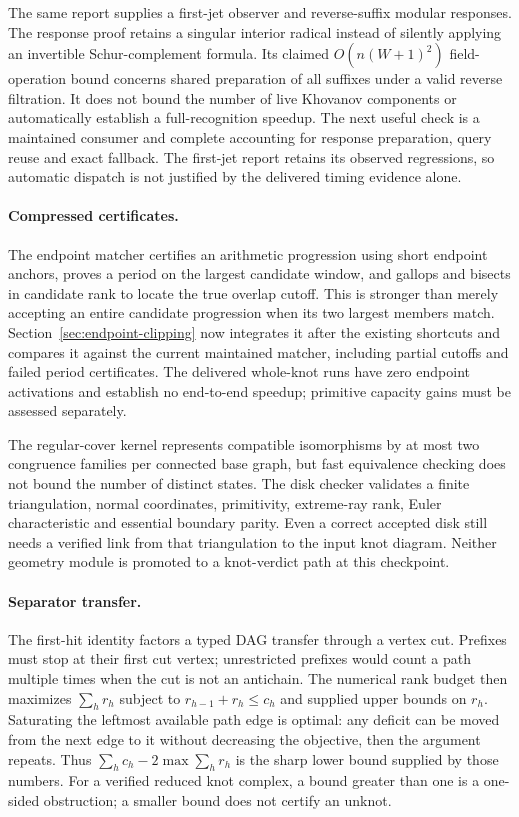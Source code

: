 The same report supplies a first-jet observer and reverse-suffix modular
responses. The response proof retains a singular interior radical instead of
silently applying an invertible Schur-complement formula. Its claimed
$O(n(W+1)^2)$ field-operation bound concerns shared preparation of all suffixes
under a valid reverse filtration. It does not bound the number of live
Khovanov components or automatically establish a full-recognition speedup.
The next useful check is a maintained consumer and complete accounting for
response preparation, query reuse and exact fallback. The first-jet report
retains its observed regressions, so automatic dispatch is not justified by
the delivered timing evidence alone.

\paragraph{Compressed certificates.}
The endpoint matcher certifies an arithmetic progression using short endpoint
anchors, proves a period on the largest candidate window, and gallops and
bisects in candidate rank to locate the true overlap cutoff. This is stronger
than merely accepting an entire candidate progression when its two largest
members match. Section~\ref{sec:endpoint-clipping} now integrates it after
the existing shortcuts and compares it against the current maintained
matcher, including partial cutoffs and failed period certificates. The
delivered whole-knot runs have zero endpoint activations and establish no
end-to-end speedup; primitive capacity gains must be assessed separately.

The regular-cover kernel represents compatible isomorphisms by at most two
congruence families per connected base graph, but fast equivalence checking
does not bound the number of distinct states. The disk checker validates a
finite triangulation, normal coordinates, primitivity, extreme-ray rank,
Euler characteristic and essential boundary parity. Even a correct accepted
disk still needs a verified link from that triangulation to the input knot
diagram. Neither geometry module is promoted to a knot-verdict path at this
checkpoint.

\paragraph{Separator transfer.}
The first-hit identity factors a typed DAG transfer through a vertex cut.
Prefixes must stop at their first cut vertex; unrestricted prefixes would
count a path multiple times when the cut is not an antichain. The numerical
rank budget then maximizes $\sum_h r_h$ subject to
$r_{h-1}+r_h\le c_h$ and supplied upper bounds on $r_h$. Saturating the
leftmost available path edge is optimal: any deficit can be moved from the
next edge to it without decreasing the objective, then the argument repeats.
Thus $\sum_h c_h-2\max\sum_h r_h$ is the sharp lower bound supplied by those
numbers. For a verified reduced knot complex, a bound greater than one is a
one-sided obstruction; a smaller bound does not certify an unknot.

